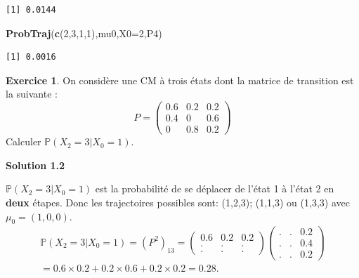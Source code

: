 \documentclass[
]{book}
\newenvironment{Shaded}{\begin{snugshade}}{\end{snugshade}}
\newcommand{\DataTypeTok}[1]{\textcolor[rgb]{0.13,0.29,0.53}{#1}}
\newcommand{\DecValTok}[1]{\textcolor[rgb]{0.00,0.00,0.81}{#1}}
\newcommand{\FloatTok}[1]{\textcolor[rgb]{0.00,0.00,0.81}{#1}}
\newcommand{\KeywordTok}[1]{\textcolor[rgb]{0.13,0.29,0.53}{\textbf{#1}}}
\newcommand{\NormalTok}[1]{#1}
\newcommand{\OperatorTok}[1]{\textcolor[rgb]{0.81,0.36,0.00}{\textbf{#1}}}
\theoremstyle{definition}
\theoremstyle{definition}
\theoremstyle{definition}
\newtheorem{exercise}{Exercice}[chapter]
\theoremstyle{remark}
\begin{document}
\begin{verbatim}
[1] 0.0144
\end{verbatim}

\begin{Shaded}
\begin{Highlighting}[]
\KeywordTok{ProbTraj}\NormalTok{(}\KeywordTok{c}\NormalTok{(}\DecValTok{2}\NormalTok{,}\DecValTok{3}\NormalTok{,}\DecValTok{1}\NormalTok{,}\DecValTok{1}\NormalTok{),mu0,}\DataTypeTok{X0=}\DecValTok{2}\NormalTok{,P4)}
\end{Highlighting}
\end{Shaded}

\begin{verbatim}
[1] 0.0016
\end{verbatim}

\begin{exercise}
\protect\hypertarget{exr:unnamed-chunk-55}{}{\label{exr:unnamed-chunk-55} } On considère une CM à trois états dont la matrice de transition est la suivante :
\[ P=\left( 
  \begin{array}{ccc}
0.6 & 0.2 & 0.2 \\
0.4 & 0 & 0.6 \\
0 & 0.8 & 0.2
\end{array}
\right)\]
Calculer \(\mathbb{P}(X_2=3|X_0=1)\).
\end{exercise}

\textbf{Solution 1.2}

\(\mathbb{P}(X_2=3|X_0=1)\) est la probabilité de se déplacer de l'état 1 à l'état 2 en \textbf{deux} étapes. Donc les trajectoires possibles sont: (1,2,3); (1,1,3) ou (1,3,3) avec \(\mu_0=(1,0,0)\).
\begin{align*}
\mathbb{P}(X_2=3|X_0=1)= \left( P^2\right)_{13} =\left( 
  \begin{array}{ccc}
0.6 & 0.2 & 0.2 \\
. & . & . \\
. & . & .
\end{array}
\right)\left( 
  \begin{array}{ccc}
. & . & 0.2 \\
. & . & 0.4 \\
. & . & 0.2
\end{array}
\right)\\
= 0.6 \times 0.2 + 0.2 \times 0.6 +0.2 \times 0.2 = 0.28.
\end{align*}

\begin{Shaded}
\end{Shaded}
\end{document}
